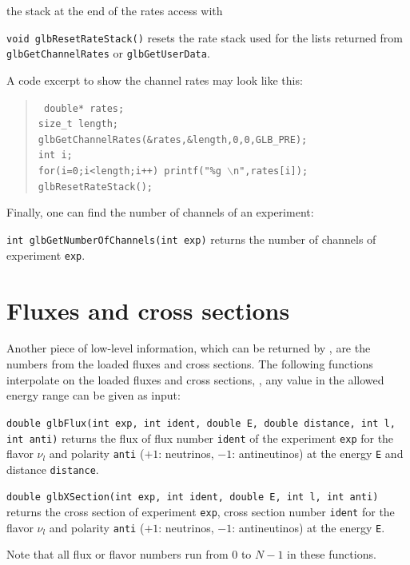 the stack at the end of the rates access with
\begin{function}
{\tt void glbResetRateStack()} resets the rate stack used for the
lists returned from {\tt glbGetChannelRates} or {\tt glbGetUserData}.
\end{function}
A code excerpt to show the channel rates may look like this:
\begin{quote}
{\tt
 double* rates; \\
  size\_t length; \\
  glbGetChannelRates(\&rates,\&length,0,0,GLB\_PRE); \\
  int i; \\
  for(i=0;i<length;i++) printf("\%g $\backslash$n",rates[i]); \\
  glbResetRateStack(); \\
}
\end{quote}
Finally, one can find the number of channels of an experiment:
\begin{function}
{\tt int glbGetNumberOfChannels(int exp)} returns the number of 
channels of experiment {\tt exp}.
\end{function}

\section{Fluxes and cross sections}
 

Another piece of low-level information, which can be returned by \GLOBES ,
are the numbers from the loaded fluxes and cross sections.
The following functions interpolate on the loaded fluxes and cross 
sections, \ie, any value in the allowed energy range can be given as input:
\begin{function}
{\tt double glbFlux(int exp, int ident, 
double E, double distance, int l, int anti)} returns
the flux of flux number {\tt ident} of the experiment {\tt exp}
for the flavor $\nu_l$ 
and polarity {\tt anti} ($+1$: neutrinos, $-1$: antineutinos) at the energy {\tt E} and distance {\tt distance}.
\end{function}

\begin{function}
{\tt double glbXSection(int exp, 
int ident, double E, int l, int anti)} returns
the cross section of experiment {\tt exp}, 
cross section number {\tt ident} for the flavor $\nu_l$ and polarity {\tt anti} ($+1$: neutrinos, $-1$: antineutinos) at the energy {\tt E}.
\end{function}
Note that all flux or flavor numbers run from $0$ to $N-1$ in these functions.


